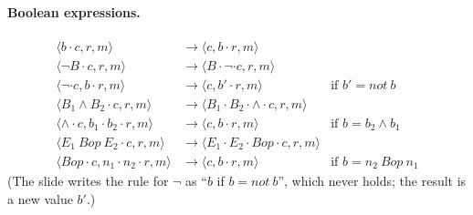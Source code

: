 \paragraph{Boolean expressions.}
\[
\begin{array}{lll}
\langle b \cdot c, r, m \rangle & \to \langle c, b \cdot r, m \rangle \\
\langle \neg B \cdot c, r, m \rangle & \to \langle B \cdot \neg \cdot c, r, m \rangle \\
\langle \neg \cdot c, b \cdot r, m \rangle & \to \langle c, b' \cdot r, m \rangle & \text{if } b' = \mathit{not}\ b \\
\langle B_1 \wedge B_2 \cdot c, r, m \rangle & \to \langle B_1 \cdot B_2 \cdot \wedge \cdot c, r, m \rangle \\
\langle \wedge \cdot c, b_1 \cdot b_2 \cdot r, m \rangle & \to \langle c, b \cdot r, m \rangle & \text{if } b = b_2 \wedge b_1 \\
\langle E_1\ \mathit{Bop}\ E_2 \cdot c, r, m \rangle & \to \langle E_1 \cdot E_2 \cdot \mathit{Bop} \cdot c, r, m \rangle \\
\langle \mathit{Bop} \cdot c, n_1 \cdot n_2 \cdot r, m \rangle & \to \langle c, b \cdot r, m \rangle & \text{if } b = n_2\ \mathit{Bop}\ n_1
\end{array}
\]
(The slide writes the rule for $\neg$ as ``$b$ if $b = \mathit{not}\ b$'', which
never holds; the result is a new value $b'$.)

